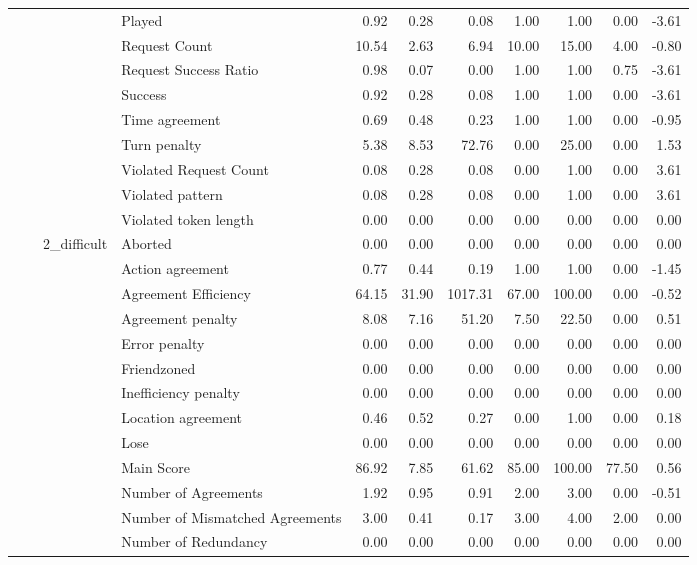 \begin{tabular}{llllrrrrrrr}
 &  &  & Played & 0.92 & 0.28 & 0.08 & 1.00 & 1.00 & 0.00 & -3.61 \\
 &  &  & Request Count & 10.54 & 2.63 & 6.94 & 10.00 & 15.00 & 4.00 & -0.80 \\
 &  &  & Request Success Ratio & 0.98 & 0.07 & 0.00 & 1.00 & 1.00 & 0.75 & -3.61 \\
 &  &  & Success & 0.92 & 0.28 & 0.08 & 1.00 & 1.00 & 0.00 & -3.61 \\
 &  &  & Time agreement & 0.69 & 0.48 & 0.23 & 1.00 & 1.00 & 0.00 & -0.95 \\
 &  &  & Turn penalty & 5.38 & 8.53 & 72.76 & 0.00 & 25.00 & 0.00 & 1.53 \\
 &  &  & Violated Request Count & 0.08 & 0.28 & 0.08 & 0.00 & 1.00 & 0.00 & 3.61 \\
 &  &  & Violated pattern & 0.08 & 0.28 & 0.08 & 0.00 & 1.00 & 0.00 & 3.61 \\
 &  &  & Violated token length & 0.00 & 0.00 & 0.00 & 0.00 & 0.00 & 0.00 & 0.00 \\
\cline{3-11}
 &  & \multirow[t]{27}{*}{2_difficult} & Aborted & 0.00 & 0.00 & 0.00 & 0.00 & 0.00 & 0.00 & 0.00 \\
 &  &  & Action agreement & 0.77 & 0.44 & 0.19 & 1.00 & 1.00 & 0.00 & -1.45 \\
 &  &  & Agreement Efficiency & 64.15 & 31.90 & 1017.31 & 67.00 & 100.00 & 0.00 & -0.52 \\
 &  &  & Agreement penalty & 8.08 & 7.16 & 51.20 & 7.50 & 22.50 & 0.00 & 0.51 \\
 &  &  & Error penalty & 0.00 & 0.00 & 0.00 & 0.00 & 0.00 & 0.00 & 0.00 \\
 &  &  & Friendzoned & 0.00 & 0.00 & 0.00 & 0.00 & 0.00 & 0.00 & 0.00 \\
 &  &  & Inefficiency penalty & 0.00 & 0.00 & 0.00 & 0.00 & 0.00 & 0.00 & 0.00 \\
 &  &  & Location agreement & 0.46 & 0.52 & 0.27 & 0.00 & 1.00 & 0.00 & 0.18 \\
 &  &  & Lose & 0.00 & 0.00 & 0.00 & 0.00 & 0.00 & 0.00 & 0.00 \\
 &  &  & Main Score & 86.92 & 7.85 & 61.62 & 85.00 & 100.00 & 77.50 & 0.56 \\
 &  &  & Number of Agreements & 1.92 & 0.95 & 0.91 & 2.00 & 3.00 & 0.00 & -0.51 \\
 &  &  & Number of Mismatched Agreements & 3.00 & 0.41 & 0.17 & 3.00 & 4.00 & 2.00 & 0.00 \\
 &  &  & Number of Redundancy & 0.00 & 0.00 & 0.00 & 0.00 & 0.00 & 0.00 & 0.00 \\

\end{tabular}
